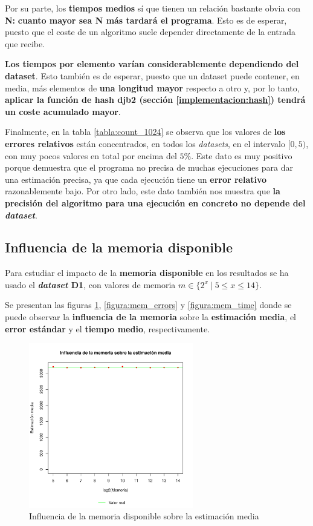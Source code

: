 Por su parte, los \textbf{tiempos medios} sí que tienen un relación bastante obvia con \textbf{N:}
\textbf{cuanto mayor sea \textbf{N} más tardará el programa}. Esto es de esperar, puesto que el coste de un algoritmo suele
depender directamente de la entrada que recibe.

\textbf{Los tiempos por elemento varían considerablemente dependiendo del dataset}. Esto también es de esperar, puesto que
un dataset puede contener, en media, más elementos de \textbf{una longitud mayor} respecto a otro y, por lo tanto,
\textbf{aplicar la función de hash djb2 (sección \ref{implementacion:hash}) tendrá un coste acumulado mayor}.

Finalmente, en la tabla \ref{tabla:count_1024} se observa que los valores de \textbf{los errores relativos} están
concentrados, en todos los \emph{datasets}, en el intervalo $[0,5)$, con muy pocos valores en total por encima del $5\%$.
Este dato es muy positivo porque demuestra que el programa no precisa de muchas ejecuciones para dar una
estimación precisa, ya que cada ejecución tiene un \textbf{error relativo} razonablemente bajo. Por otro lado, este dato también
nos muestra que \textbf{la precisión del algoritmo para una ejecución en concreto no depende del \emph{dataset}}.

\subsection{Influencia de la memoria disponible}
\label{analisis:D1_mem}

Para estudiar el impacto de la \textbf{memoria disponible} en los resultados se ha usado el \textbf{\emph{dataset} D1},
con valores de memoria $m \in \{ 2^x \: | \; 5 \leq x \leq 14 \}$.

Se presentan las figuras \ref{figura:mem_estimation}, \ref{figura:mem_errors} y \ref{figura:mem_time} donde se puede observar la
\textbf{influencia de la memoria} sobre la \textbf{estimación media}, el \textbf{error estándar} y el \textbf{tiempo medio},
respectivamente.

\begin{figure}[h!]
    \centering
        \includegraphics[width=0.64\textwidth]{../figs/D1/mem_estimation_rel.pdf}
        \caption{Influencia de la memoria disponible sobre la estimación media}
    \label{figura:mem_estimation}
\end{figure}

